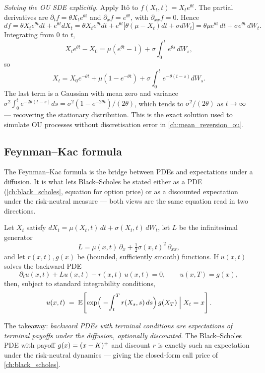 \emph{Solving the OU SDE explicitly.} Apply It\^o to
$f(X_t, t) = X_t e^{\theta t}$. The partial derivatives are
$\partial_t f = \theta X_t e^{\theta t}$ and
$\partial_x f = e^{\theta t}$, with $\partial_{xx}f = 0$. Hence
\[
df = \theta X_t e^{\theta t} dt + e^{\theta t} dX_t
   = \theta X_t e^{\theta t} dt + e^{\theta t}\big[\theta(\mu - X_t)dt + \sigma dW_t\big]
   = \theta\mu e^{\theta t}\, dt + \sigma e^{\theta t}\, dW_t.
\]
Integrating from $0$ to $t$,
\[
X_t e^{\theta t} - X_0 = \mu(e^{\theta t} - 1) + \sigma \int_0^t e^{\theta s}\, dW_s,
\]
so
\[
X_t = X_0 e^{-\theta t} + \mu(1 - e^{-\theta t}) + \sigma \int_0^t e^{-\theta(t-s)} dW_s.
\]
The last term is a Gaussian with mean zero and variance
$\sigma^2 \int_0^t e^{-2\theta(t-s)} ds = \sigma^2 (1-e^{-2\theta t})/(2\theta)$,
which tends to $\sigma^2/(2\theta)$ as $t \to \infty$ --- recovering the
stationary distribution. This is the exact solution used to simulate OU
processes without discretisation error in
\cref{ch:mean_reversion_ou}.

\subsection{Feynman--Kac formula}

The Feynman--Kac formula is the bridge between PDEs and expectations
under a diffusion. It is what lets Black--Scholes be stated either as a
PDE (\cref{ch:black_scholes}, equation for option price) or as a
discounted expectation under the risk-neutral measure --- both views are
the same equation read in two directions.

\begin{keyfactbox}
Let $X_t$ satisfy $dX_t = \mu(X_t, t)\, dt + \sigma(X_t, t)\, dW_t$, let
$L$ be the infinitesimal generator
\[
L = \mu(x, t)\,\partial_x + \tfrac{1}{2}\sigma(x,t)^2\,\partial_{xx},
\]
and let $r(x,t), g(x)$ be (bounded, sufficiently smooth) functions. If
$u(x,t)$ solves the backward PDE
\[
\partial_t u(x,t) + Lu(x,t) - r(x,t)\,u(x,t) = 0,
\qquad u(x,T) = g(x),
\]
then, subject to standard integrability conditions,
\[
u(x,t) \;=\; \mathbb{E}\!\left[\exp\!\Big(-\!\int_t^T r(X_s, s)\,ds\Big)\,
                         g(X_T) \;\Big|\; X_t = x\right].
\]
\end{keyfactbox}

The takeaway: \emph{backward PDEs with terminal conditions are
expectations of terminal payoffs under the diffusion, optionally
discounted}. The Black--Scholes PDE with payoff $g(x) = (x - K)^+$
and discount $r$ is exactly such an expectation under the risk-neutral
dynamics --- giving the closed-form call price of \cref{ch:black_scholes}.

